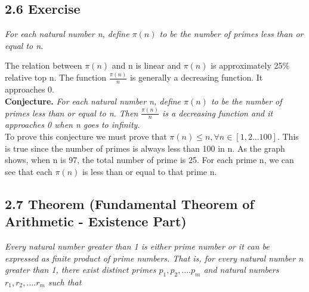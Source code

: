 \documentclass{article}
\begin{document}
\subsection*{2.6 Exercise} 
\quad \textit{For each natural number n, define $\pi(n)$ to be the number of primes less than or equal to n.}


The relation between $\pi(n)$ and n is linear and $\pi(n)$ is approximately 25\% relative top n. The function $\frac{\pi(n)}{n}$ is generally a decreasing function. It approaches 0.\\
\textbf{Conjecture.} \textit{For each natural number n, define $\pi(n)$ to be the number of primes less than or equal to n. Then $\frac{\pi(n)}{n}$ is a decreasing function and it approaches 0 when n goes to infinity.}\\
To prove this conjecture we must prove that $\pi(n) \leq n, \forall n \in [1,2...100]$. This is true since the number of primes is always less than 100 in n. As the graph shows, when n is 97, the total number of prime is 25. For each prime n, we can see that each $\pi(n)$ is less than or equal to that prime n.  

\subsection*{2.7 Theorem (Fundamental Theorem of Arithmetic - Existence Part)} 
\quad \textit{Every natural number greater than 1 is either prime number or it can be expressed as finite product of prime numbers. That is, for every natural number n greater than 1, there exist distinct primes $p_1, p_2,....p_m$ and natural numbers $r_1,r_2,....r_m$ such that}
\end{document}
